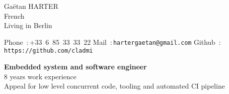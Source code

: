 \documentclass{cv}
\begin{document}
\begin{chapeau}
\hspace{1cm}
\begin{adresse}
        Gaëtan HARTER\\
        French \\
        Living in Berlin
\end{adresse}
\begin{etatcivil}
        Phone~:\,+33~6~85~33~33~22
        Mail~:\,\texttt{hartergaetan@gmail.com}
        Github~:\,\texttt{https://github.com/cladmi}
\end{etatcivil}
\hspace{2cm}
\end{chapeau}

\begin{center}
        \textbf{\Large Embedded system and software engineer\\}
        \large 8 years work experience\\
        {\large Appeal for low level concurrent code, tooling and automated CI pipeline}\\
\end{center}
\end{document}
